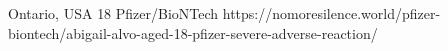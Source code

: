           {Ontario, USA}
          {18}
          {Pfizer/BioNTech}
          {}
          {}
          {https://nomoresilence.world/pfizer-biontech/abigail-alvo-aged-18-pfizer-severe-adverse-reaction/}

